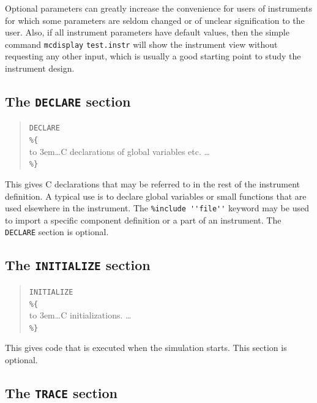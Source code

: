 Optional parameters can greatly increase the convenience for users of
instruments for which some parameters are seldom changed or of unclear signification to the user. Also, if all instrument parameters have default values, then the simple command \verb+mcdisplay+ \verb+test.instr+ will show the instrument view without requesting any other input, which is usually a good starting point to study the instrument design.

\subsection{The \texttt{DECLARE} section}
\label{s:declare}

\begin{quote}
  \texttt{DECLARE} \\
  \verb|%{| \\
  \hbox to 3em{}\ldots C declarations of global variables etc. \ldots \\
  \verb|%}|
\end{quote} 
This gives C declarations that may be referred to in the rest of the
instrument definition. A typical use is to declare global variables or
small functions that are used elsewhere in the instrument. The \verb+%include ''file''+ keyword may be used to import a specific
component definition or a part of an instrument. The \texttt{DECLARE} section is optional.

\subsection{The \texttt{INITIALIZE} section}
\label{s:initialize}

\begin{quote}
  \texttt{INITIALIZE} \\
  \verb|%{| \\
  \hbox to 3em{}\ldots C initializations. \ldots \\
  \verb|%}|
\end{quote} 
This gives code that is executed when the simulation starts. This section is
optional.


\subsection{The \texttt{TRACE} section}
\label{s:trace}

